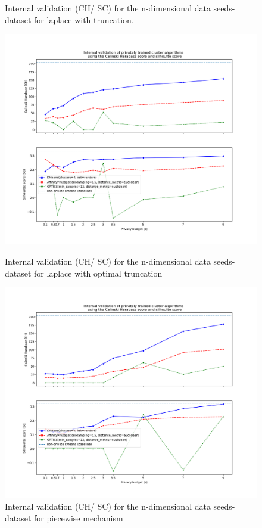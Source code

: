 \begin{figure}[H]
\begin{minipage}[c]{0.49\textwidth}
        \caption{Internal validation (CH/ SC) for the n-dimensional data seeds-dataset for laplace with truncation.}
        \label{fig:appendix-internal-validation-seeds-dataset_comparison_nd-laplace-truncated}
    \end{minipage}
    \begin{minipage}[c]{0.49\textwidth}
        \includegraphics[width=1\textwidth]{Results/nd-laplace-optimal-truncated/seeds-dataset/ch-and-sc.png}
        \caption{Internal validation (CH/ SC) for the n-dimensional data seeds-dataset for laplace with optimal truncation}
        \label{fig:appendix-internal-validation-seeds-dataset_comparison_nd-laplace-optimal-truncated}
    \end{minipage}
    \begin{minipage}[c]{0.49\textwidth}
        \includegraphics[width=1\textwidth]{Results/nd-piecewise/seeds-dataset/ch-and-sc.png}
        \caption{Internal validation (CH/ SC) for the n-dimensional data seeds-dataset for piecewise mechanism}
        \label{fig:appendix-internal-validation-seeds-dataset_comparison_nd-piecewise}
    \end{minipage}
\end{figure}
